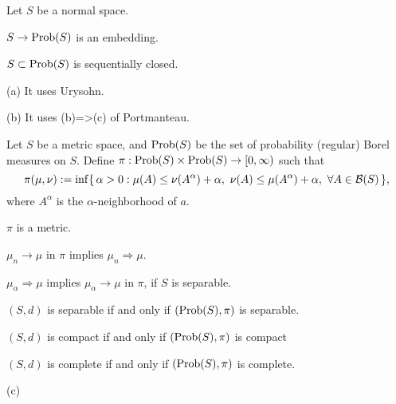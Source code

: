 \documentclass{../note}
\begin{document}
\begin{prb}
Let $S$ be a normal space.
\begin{parts}
\item $S\to\operatorname{Prob}(S)$ is an embedding.
\item $S\subset\operatorname{Prob}(S)$ is sequentially closed.
\item %
\end{parts}
\end{prb}
\begin{pf}
(a)
It uses Urysohn.

(b)
It uses (b)=>(c) of Portmanteau.
\end{pf}


\begin{prb}
Let $S$ be a metric space, and $\operatorname{Prob}(S)$ be the set of probability (regular) Borel measures on $S$.
Define $\pi:\operatorname{Prob}(S)\times\operatorname{Prob}(S)\to[0,\infty)$ such that
\[\pi(\mu,\nu):=\inf\{\,\alpha>0:\mu(A)\le\nu(A^\alpha)+\alpha,\ \nu(A)\le\mu(A^\alpha)+\alpha,\ \forall A\in\cB(S)\,\},\]
where $A^\alpha$ is the $\alpha$-neighborhood of $a$.
\begin{parts}
\item $\pi$ is a metric.
\item $\mu_n\to\mu$ in $\pi$ implies $\mu_n\Rightarrow\mu$.
\item $\mu_\alpha\Rightarrow\mu$ implies $\mu_\alpha\to\mu$ in $\pi$, if $S$ is separable.
\item $(S,d)$ is separable if and only if $(\operatorname{Prob}(S),\pi)$ is separable.
\item $(S,d)$ is compact if and only if $(\operatorname{Prob}(S),\pi)$ is compact
\item $(S,d)$ is complete if and only if $(\operatorname{Prob}(S),\pi)$ is complete.
\end{parts}
\end{prb}
\begin{pf}
(c)
\end{pf}
\end{document}
